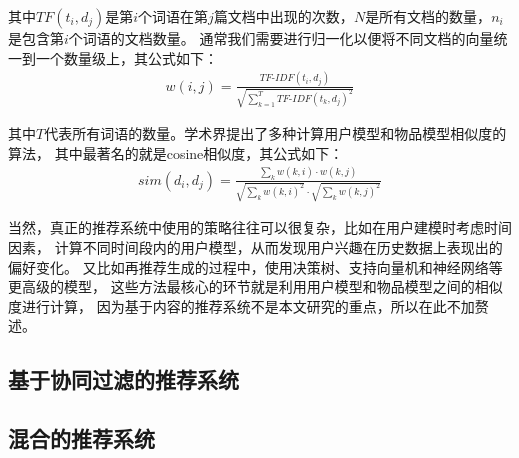 其中$TF(t_i, d_j)$是第$i$个词语在第$j$篇文档中出现的次数，$N$是所有文档的数量，$n_i$是包含第$i$个词语的文档数量。
通常我们需要进行归一化以便将不同文档的向量统一到一个数量级上，其公式如下：
\begin{equation}
\begin{split}
w(i, j) = \frac{ TF\textrm{-}IDF(t_i, d_j) }{ \sqrt{\sum_{k=1}^{T}{TF\textrm{-}IDF(t_k, d_j)^2}} } 
\end{split}
\end{equation}

其中$T$代表所有词语的数量。学术界提出了多种计算用户模型和物品模型相似度的算法，
其中最著名的就是cosine相似度，其公式如下：
\begin{equation}
\begin{split}
sim(d_i, d_j) = \frac{ \sum_k{ w(k, i) \cdot w(k, j) } }
{ \sqrt{\sum_{k}{w(k, i)^2}} \cdot \sqrt{\sum_{k}{w(k, j)^2}} } 
\end{split}
\end{equation}

当然，真正的推荐系统中使用的策略往往可以很复杂，比如在用户建模时考虑时间因素，
计算不同时间段内的用户模型，从而发现用户兴趣在历史数据上表现出的偏好变化。
又比如再推荐生成的过程中，使用决策树、支持向量机和神经网络等更高级的模型，
这些方法最核心的环节就是利用用户模型和物品模型之间的相似度进行计算，
因为基于内容的推荐系统不是本文研究的重点，所以在此不加赘述。

\subsection{基于协同过滤的推荐系统}


\subsection{混合的推荐系统}
